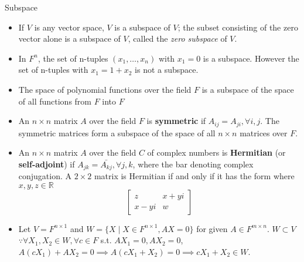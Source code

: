 \documentclass[8pt]{beamer}
\newcommand{\mbb}[1]{\mathbb{#1}}
\newcommand{\tb}[1]{\textbf{#1}}
\newcommand{\ti}[1]{\textit{#1}}
\begin{document}
\begin{frame}{Subspace}
    \begin{itemize}
        \item If $V$ is any vector space, $V$ is a subspace of $V$; the subset consisting of the zero vector alone is a subspace of $V$, called the \ti{zero subspace} of $V$.
        \item In $F^n$, the set of n-tuples $(x_1, \dots, x_n)$ with $x_1 = 0$ is a subspace. However the set of n-tuples with $x_1 = 1 + x_2$ is not a subspace.
        \item The space of polynomial functions over the field $F$ is a subspace of the space of all functions from $F$ into $F$
        \item An $n \times n $ matrix $A$ over the field $F$ is \tb{symmetric} if $A_{ij} = A_{ji}, \forall i,j$. The symmetric matrices form a subspace of the space of all $n \times n $ matrices over $F$.
        \item An $n \times n$ matrix $A$ over the field $C$ of complex numbers is \tb{Hermitian} (or \tb{self-adjoint}) if $A_{jk} = \bar{A_{kj}}, \forall j, k$, where the bar denoting complex conjugation. A $2\times 2$ matrix is Hermitian if and only if it has the form where $x, y, z \in \mbb{R}$
        \[
        \left[
            \begin{matrix}
                z & x+yi \\ x - yi & w
            \end{matrix}
        \right]
        \]
        \item Let $V = F^{n \times 1}$ and $W = \{X \mid X \in F^{n \times 1}, AX = 0\}$ for given $A \in F^{m \times n}$. $W \subset V$  $\because \forall X_1, X_2 \in W, \forall c \in F  $ s.t. $AX_1= 0 , AX_2 = 0$, $A(cX_1) + AX_2 = 0 \implies A(cX_1 + X_2) = 0 \implies cX_1 + X_2 \in W$.
    \end{itemize}
\end{frame}
\end{document}

